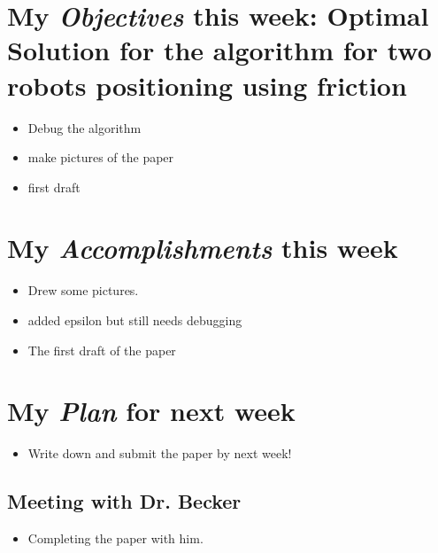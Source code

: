 \newcommand{\handoutName}{Weekly report}
\newcommand{\handoutdate}{\today}


\section{My \emph{Objectives} this week: Optimal Solution for the algorithm for two robots positioning using friction}
\begin{itemize}
\item Debug the algorithm
\item make pictures of the paper
\item first draft
\end{itemize}



\section{My \emph{Accomplishments} this week}


\begin{itemize}
\item Drew some pictures.
\item added epsilon but still needs debugging
\item The first draft of the paper
\end{itemize}


\section{My \emph{Plan} for next week}

\begin{itemize}
\item Write down and submit the paper by next week!
\end{itemize}

\subsection{Meeting with Dr. Becker  }

\begin{itemize}
\item Completing the paper with him.
\end{itemize}


